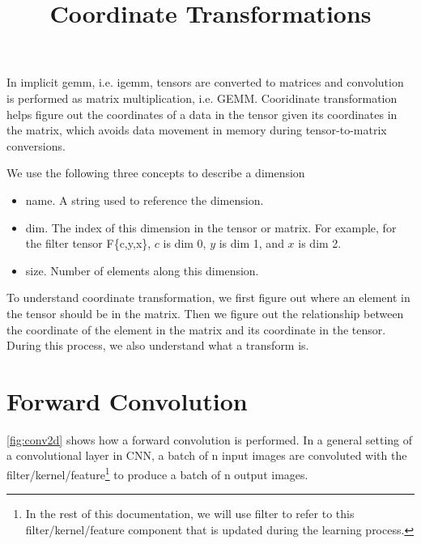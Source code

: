 



\title{Coordinate Transformations}

\maketitle


In implicit gemm, i.e. igemm, tensors are converted to matrices and convolution
is performed as matrix multiplication, i.e. GEMM.
Cooridinate transformation helps figure out the coordinates of a data in the
tensor given its coordinates in the matrix, which avoids data movement in memory
during tensor-to-matrix conversions.

We use the following three concepts to describe a dimension
\begin{itemize}
\item name. A string used to reference the dimension.
\item dim. The index of this dimension in the tensor or matrix.
  For example, for the filter tensor F\{c,y,x\},
  $c$ is dim 0, $y$ is dim 1, and $x$ is dim 2.
\item size. Number of elements along this dimension.
\end{itemize}

To understand coordinate transformation, we first figure out where an element
in the tensor should be in the matrix.
Then we figure out the relationship between the coordinate of the element in the
matrix and its coordinate in the tensor.
During this process, we also understand what a transform is.


\section{Forward Convolution}

\Fig \ref{fig:conv2d} shows how a forward convolution is performed.
In a general setting of a convolutional layer in CNN, a batch of n input images are
convoluted with the filter/kernel/feature\footnote{
  In the rest of this documentation, we will use filter to refer to this
  filter/kernel/feature component that is updated during the learning process.
}
to produce a batch of n output images.

